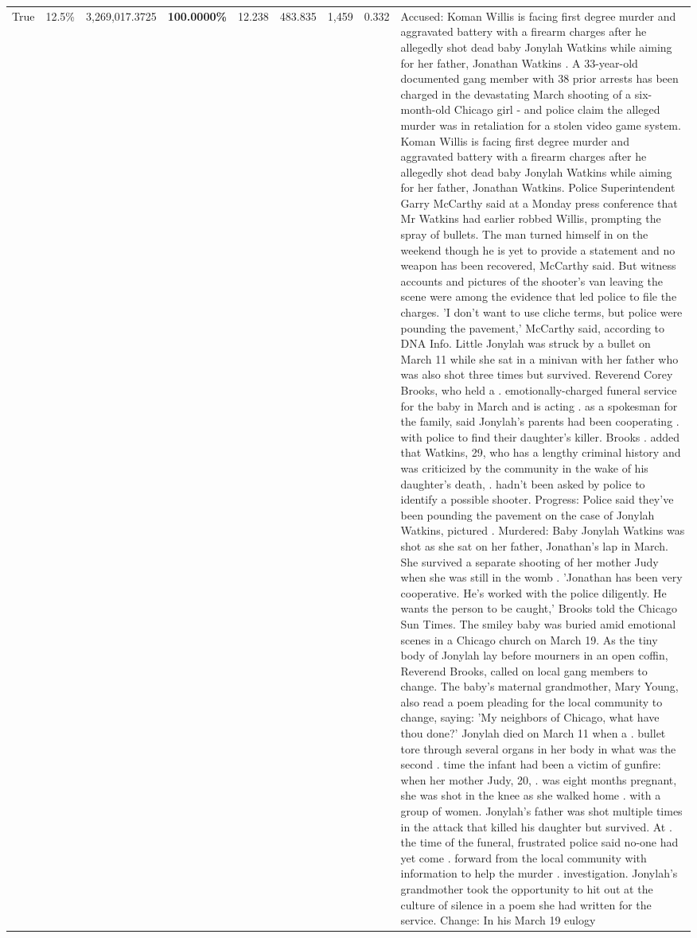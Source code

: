 \begin{table}[H]
\begin{tabular}{lllrlllll}
True & 12.5\% & 3,269,017.3725 & \bfseries \color{red} 100.0000\% & 12.238 & 483.835 & 1,459 & 0.332 & Accused: Koman Willis is facing first degree murder and aggravated battery with a firearm charges after he allegedly shot dead baby Jonylah Watkins while aiming for her father, Jonathan Watkins . A 33-year-old documented gang member with 38 prior arrests has been charged in the devastating March shooting of a six-month-old Chicago girl - and police claim the alleged murder was in retaliation for a stolen video game system. Koman Willis is facing first degree murder and aggravated battery with a firearm charges after he allegedly shot dead baby Jonylah Watkins while aiming for her father, Jonathan Watkins. Police Superintendent Garry McCarthy said at a Monday press conference that Mr Watkins had earlier robbed Willis, prompting the spray of bullets. The man turned himself in on the weekend though he is yet to provide a statement and no weapon has been recovered, McCarthy said. But witness accounts and pictures of the shooter's van leaving the scene were among the evidence that led police to file the charges. 'I don't want to use cliche terms, but police were pounding the pavement,' McCarthy said, according to DNA Info. Little Jonylah was struck by a bullet on March 11 while she sat in a minivan with her father who was also shot three times but survived. Reverend Corey Brooks, who held a . emotionally-charged funeral service for the baby in March and is acting . as a spokesman for the family, said Jonylah's parents had been cooperating . with police to find their daughter's killer. Brooks . added that Watkins, 29, who has a lengthy criminal history and was criticized by the community in the wake of his daughter's death, . hadn't been asked by police to identify a possible shooter. Progress: Police said they've been pounding the pavement on the case of Jonylah Watkins, pictured . Murdered: Baby Jonylah Watkins was shot as she sat on her father, Jonathan's lap in March. She survived a separate shooting of her mother Judy when she was still in the womb . 'Jonathan has been very cooperative. He's worked with the police diligently. He wants the person to be caught,' Brooks told the Chicago Sun Times. The smiley baby was buried amid emotional scenes in a Chicago church on March 19. As the tiny body of Jonylah lay before mourners in an open coffin, Reverend Brooks, called on local gang members to change. The baby's maternal grandmother, Mary Young, also read a poem pleading for the local community to change, saying: 'My neighbors of Chicago, what have thou done?' Jonylah died on March 11 when a . bullet tore through several organs in her body in what was the second . time the infant had been a victim of gunfire: when her mother Judy, 20, . was eight months pregnant, she was shot in the knee as she walked home . with a group of women. Jonylah's father was shot multiple times in the attack that killed his daughter but survived. At . the time of the funeral, frustrated police said no-one had yet come . forward from the local community with information to help the murder . investigation. Jonylah's grandmother took the opportunity to hit out at the culture of silence in a poem she had written for the service. Change: In his March 19 eulogy 
\end{tabular}
\end{table}

